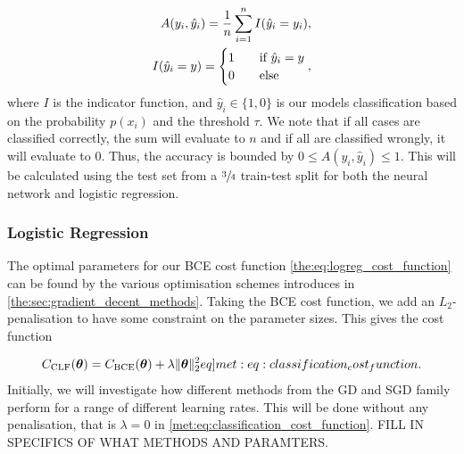     \begin{align}
        A(y_i, \hat{y}_i) = \frac{1}{n}\sum_{i=1}^{n} I(\hat{y}_i = y_i), \\
        I(\hat{y}_i = y) = \begin{cases}
            1\hspace{10px}&\text{if }\hat{y}_i = y \\
            0\hspace{10px}&\text{else}
        \end{cases} \nonumber,
    \end{align}
    where $I$ is the indicator function, and $\hat{y}_i \in \{ 1, 0\}$ is our models classification based on the probability $p(x_i)$ and the threshold $\tau$. We note that if all cases are classified correctly, the sum will evaluate to $n$ and if all are classified wrongly, it will evaluate to 0. Thus, the accuracy is bounded by $0 \leq A(y_i, \hat{y}_i) \leq 1$. This will be calculated using the test set from a $\sfrac{3}{4}$ train-test split for both the neural network and logistic regression.

    \subsubsection{Logistic Regression}
    The optimal parameters for our BCE cost function \cref{the:eq:logreg_cost_function} can be found by the various optimisation schemes introduces in \cref{the:sec:gradient_decent_methods}. Taking the BCE cost function, we add an $L_2$-penalisation to have some constraint on the parameter sizes. This gives the cost function

    \begin{align}
        \msub{C}{CLF}(\vec{\theta}) = \msub{C}{BCE}(\vec{\theta}) +  \lambda\norm[2]{\vec{\theta}}^2
        \label[eq]{met:eq:classification_cost_function}.
    \end{align}
    Initially, we will investigate how different methods from the GD and SGD family perform for a range of different learning rates. This will be done without any penalisation, that is $\lambda = 0$ in \cref{met:eq:classification_cost_function}. FILL IN SPECIFICS OF WHAT METHODS AND PARAMTERS.

